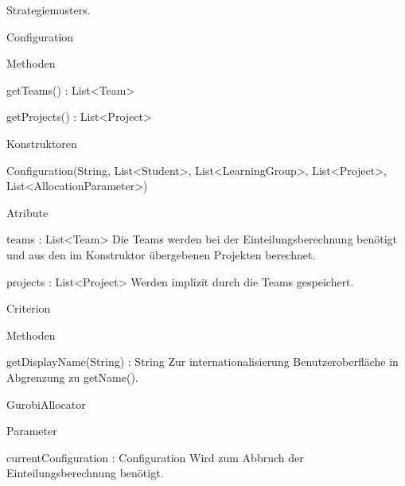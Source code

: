 \documentclass[parskip=full]{scrartcl}
\newcommand{\changeDescription}[1]{{\newline\color{black}\normalfont #1}}
\newcommand{\code}[1]{{\ttfamily #1}}
\begin{document}
\begin{itemPackage}
\begin{itemClass}
\begin{itemClassSub}
\begin{itemPlus}
{Strategiemusters.}
\end{itemPlus}
\end{itemClassSub}
\item Configuration
\begin{itemClassSub}
\item Methoden
\begin{itemPlus}
\item getTeams() : List<Team> 
\end{itemPlus}
\begin{itemMinus}
\item getProjects() : List<Project> 
\end{itemMinus}
\item Konstruktoren
\begin{itemPlus}
\item Configuration(String, List<Student>, List<LearningGroup>, List<Project>,
List<AllocationParameter>)
\end{itemPlus}
\item Atribute
\begin{itemPlus}
\item teams : List<Team> \changeDescription{Die Teams werden bei der
Einteilungsberechnung benötigt und aus den im Konstruktor übergebenen
Projekten berechnet.}
\end{itemPlus}
\begin{itemMinus}
\item projects : List<Project> \changeDescription{Werden implizit durch die
Teams gespeichert.}
\end{itemMinus}
\end{itemClassSub}
\item Criterion
\begin{itemClassSub}
\item Methoden
\begin{itemPlus}
\item getDisplayName(String) : String \changeDescription{Zur
internationalisierung Benutzeroberfläche in Abgrenzung zu \code{getName()}.}
\end{itemPlus}
\end{itemClassSub}
\item GurobiAllocator
\begin{itemClassSub}
\item Parameter
\begin{itemPlus}
\item currentConfiguration : Configuration \changeDescription{Wird zum Abbruch
der Einteilungsberechnung benötigt.}
\end{itemPlus}

\end{itemClassSub}
\end{itemClass}
\end{itemPackage}
\end{document}
